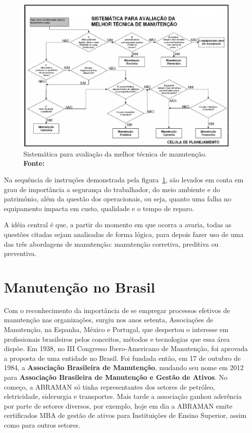 \graphicspath{{figuras/}}
\begin{figure}[H]
\centering
\includegraphics[width=1.2\textwidth]{Sistem_tica_para_a_melhor_t_cnica_de_manuten_o.eps}
\caption{Sistemática para avaliação da melhor técnica de manutenção. \textbf{Fonte: \cite{neumann2013gestao}}}
\label{melhor_tecnica_de_manutencao}
\end{figure}

Na sequência de instruções demonstrada pela figura~\ref{melhor_tecnica_de_manutencao}, são levados em conta em grau de importância a segurança do trabalhador, do meio ambiente e do patrimônio, além da questão dos operacionais, ou seja, quanto uma falha no equipamento impacta em custo, qualidade e o tempo de reparo.

A idéia central é que, a partir do momento em que ocorra a avaria, todas as questões citadas sejam analisadas de forma lógica, para depois fazer uso de uma das três abordagens de manutenção: manutenção corretiva, preditiva ou preventiva.


\section{Manutenção no Brasil}

Com o reconhecimento da importância de se empregar processos efetivos de manutenção nas organizações, surgiu nos anos setenta, Associações de Manutenção, na Espanha, México e Portugal, que despertou o interesse em profissionais brasileiros pelos conceitos, métodos e tecnologias que essa área dispõe. Em 1938, no III Congresso Ibero-Americano de Manutenção, foi aprovada a proposta de uma entidade no Brasil. Foi fundada então, em 17 de outubro de 1984, a \textbf{Associação Brasileira de Manutenção}, mudando seu nome em 2012 para \textbf{Associação Brasileira de Manutenção e Gestão de Ativos}. No começo, a ABRAMAN só tinha representantes dos setores de petróleo, eletricidade, siderurgia e transportes. Mais tarde a associação ganhou aderência por parte de setores diversos, por exemplo, hoje em dia a ABRAMAN emite certificados MBA de gestão de ativos para Instituições de Ensino Superior, assim como para outros setores. 

